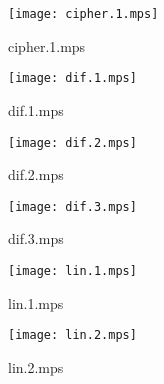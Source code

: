 \documentclass[letterpaper,10pt]{article}
\begin{document}
\begin{figure}
    \centering
    \texttt{[image: cipher.1.mps]}
    \caption{cipher.1.mps}
\end{figure}

\begin{figure}
    \centering
    \texttt{[image: dif.1.mps]}
    \caption{dif.1.mps}
\end{figure}

\begin{figure}
    \centering
    \texttt{[image: dif.2.mps]}
    \caption{dif.2.mps}
\end{figure}

\begin{figure}
    \centering
    \texttt{[image: dif.3.mps]}
    \caption{dif.3.mps}
\end{figure}

\begin{figure}
    \centering
    \texttt{[image: lin.1.mps]}
    \caption{lin.1.mps}
\end{figure}

\begin{figure}
    \centering
    \texttt{[image: lin.2.mps]}
    \caption{lin.2.mps}
\end{figure}
\end{document}
